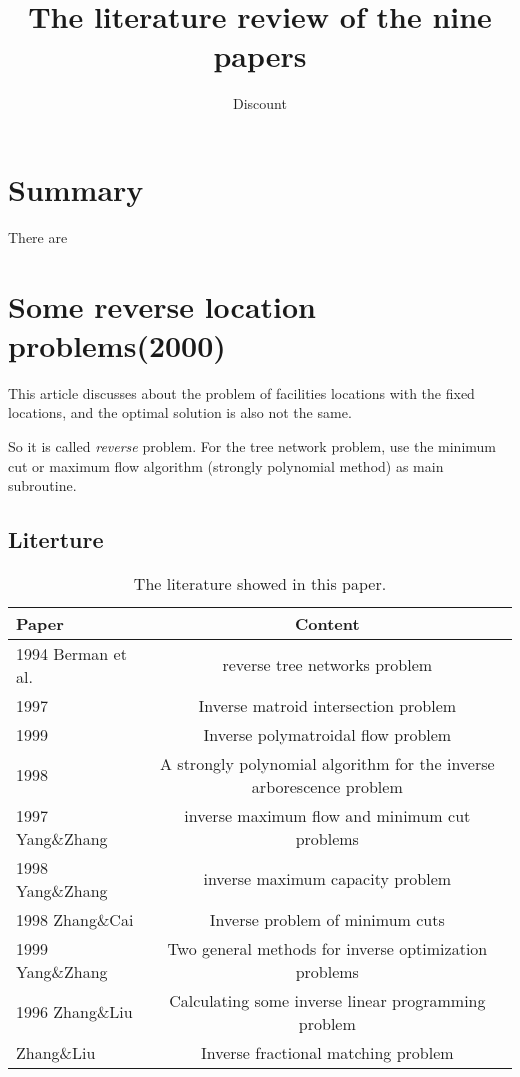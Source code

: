 \documentclass[UTF8]{article}
\title{The literature review of the nine papers}
\author{Dis\cdot count}
\begin{document}
\maketitle{}

\section{Summary}

There are



\section{Some reverse location problems(2000)}

This article discusses about the problem of facilities locations with the fixed locations, and the optimal solution is also not the same.

So it is called \emph{reverse} problem. For the tree network problem, use the minimum cut or maximum flow algorithm (strongly polynomial method) as main subroutine.

\subsection{Literture}

\begin{table}[ht]

\tabcolsep=70pt

\small\renewcommand{}

\caption{The literature showed in this paper.\label{tab:1}}

{\begin{tabular}{lc}
\hline
Paper & Content \\
\hline
1994 Berman et al. & reverse tree networks problem \\
\hline
1997  &  Inverse matroid intersection problem \\
\hline
1999  &  Inverse polymatroidal flow problem \\
\hline
1998  &  A strongly polynomial algorithm for the inverse arborescence problem \\
\hline
1997 Yang\&Zhang & inverse maximum flow and minimum cut problems \\
\hline
1998 Yang\&Zhang & inverse maximum capacity problem \\
\hline
1998 Zhang\&Cai  & Inverse problem of minimum cuts \\
\hline
1999 Yang\&Zhang & Two general methods for inverse optimization problems \\
\hline
1996 Zhang\&Liu & Calculating some inverse linear programming problem \\
\hline
[17] Zhang\&Liu & Inverse fractional matching problem
\end{tabular}}
{}
\end{table}
\end{document}
